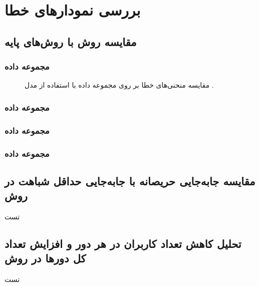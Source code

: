 \chapter{بررسی نمودارهای خطا}

\section{
	مقایسه روش
	با روش‌های پایه
}


\subsection{
	مجموعه داده
}

\begin{figure}[h]
	\centering
	\hspace{1.5mm}
	\caption{
		مقایسه منحنی‌های خطا بر روی مجموعه داده
		با استفاده از مدل
		.
	}
	\label{app_result_mnist_mlp}
\end{figure}



\FloatBarrier
\subsection{
	مجموعه داده
}



\subsection{
	مجموعه داده
}



\subsection{
	مجموعه داده
}



\section{
	مقایسه جابه‌جایی حریصانه با جابه‌جایی حداقل شباهت در روش
}
تست


\section{
	تحلیل کاهش تعداد کاربران در هر دور و افزایش تعداد کل دورها در روش
}
تست
